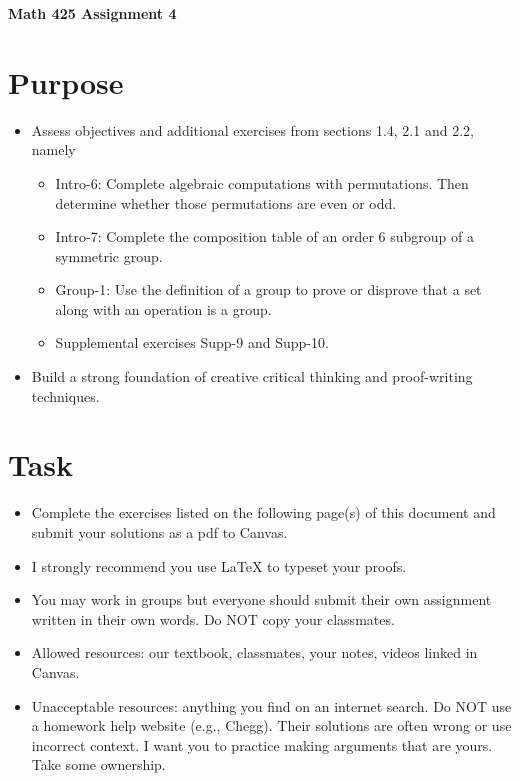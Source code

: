 \documentclass[12pt]{article}
\begin{document}
	\begin{center}
		{\Large \bf Math 425 Assignment 4}
	\end{center}
	\section*{Purpose}
		\begin{itemize}
			\item Assess objectives and additional exercises from sections 1.4, 2.1 and 2.2, namely
				\begin{itemize}
					\item Intro-6: Complete algebraic computations with permutations. Then determine whether those permutations are even or odd.
					\item Intro-7: Complete the composition table of an order 6 subgroup of a symmetric group.
					\item Group-1: Use the definition of a group to prove or disprove that a set along with an operation is a group.
					\item Supplemental exercises Supp-9 and Supp-10.
				\end{itemize}
			\item Build a strong foundation of creative critical thinking and proof-writing techniques.
		\end{itemize}
	\section*{Task}
		\begin{itemize}
			\item Complete the exercises listed on the following page(s) of this document and submit your solutions as a pdf to Canvas.
			\item I strongly recommend you use LaTeX to typeset your proofs.
			\item You may work in groups but everyone should submit their own assignment written in their own words.  Do NOT copy your classmates.
			\item Allowed resources: our textbook, classmates, your notes, videos linked in Canvas.
			\item Unacceptable resources: anything you find on an internet search. Do NOT use a homework help website (e.g., Chegg). Their solutions are often wrong or use incorrect context.  I want you to practice making arguments that are yours. Take some ownership.
		\end{itemize}
\end{document}
